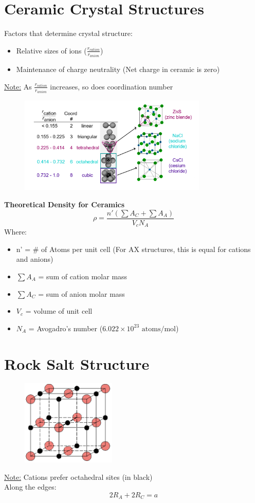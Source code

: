 \documentclass[12pt]{article}
\begin{document}
\section*{Ceramic Crystal Structures}
Factors that determine crystal structure:
\begin{itemize}
    \item Relative sizes of ions ($\frac{r_{cation}}{r_{anion}}$)
    \item Maintenance of charge neutrality (Net charge in ceramic is zero)
\end{itemize}
\underline{Note:} As $\frac{r_{cation}}{r_{anion}}$ increases, so does coordination number
\begin{figure}[H]
    \centering
    \includegraphics[width=0.8\textwidth]{ceramic.png}
\end{figure}
\newpage
\noindent\textbf{Theoretical Density for Ceramics}
\[\rho =\frac{n'(\sum A_C+\sum A_A)}{V_c N_A}\]
Where:
\begin{itemize}
    \item n' = \# of Atoms per unit cell (For AX structures, this is equal for cations and anions)
    \item $\sum A_A$ = sum of cation molar mass
    \item $\sum A_C$ = sum of anion molar mass
    \item $V_c$ = volume of unit cell
    \item $N_A$ = Avogadro's number ($6.022 \times 10^{23} \text{ atoms/mol}$)
\end{itemize}
\section*{Rock Salt Structure}
\begin{figure}[H]
    \centering
    \includegraphics[width=0.4\textwidth]{Rocksalt.png}
\end{figure}
\underline{Note:} Cations prefer octahedral sites (in black)\\
Along the edges:
\[2R_A+2R_C=a\]
\end{document}
